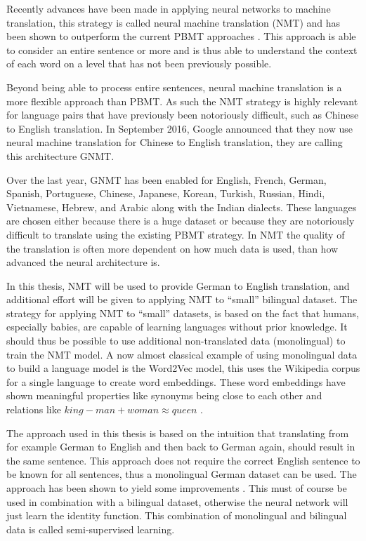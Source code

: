 Recently advances have been made in applying neural networks to machine translation, this strategy is called neural machine translation (NMT) and has been shown to outperform the current PBMT approaches \cite{google-translate-gnmt}. This approach is able to consider an entire sentence or more and is thus able to understand the context of each word on a level that has not been previously possible.

Beyond being able to process entire sentences, neural machine translation is a more flexible approach than PBMT. As such the NMT strategy is highly relevant for language pairs that have previously been notoriously difficult, such as Chinese to English translation. In September 2016, Google announced that they now use neural machine translation for Chinese to English translation, they are calling this architecture GNMT.

Over the last year, GNMT has been enabled for English, French, German, Spanish, Portuguese, Chinese, Japanese, Korean, Turkish, Russian, Hindi, Vietnamese, Hebrew, and Arabic along with the Indian dialects. These languages are chosen either because there is a huge dataset or because they are notoriously difficult to translate using the existing PBMT strategy. In NMT the quality of the translation is often more dependent on how much data is used, than how advanced the neural architecture is.

In this thesis, NMT will be used to provide German to English translation, and additional effort will be given to applying NMT to ``small'' bilingual dataset. The strategy for applying NMT to ``small'' datasets, is based on the fact that humans, especially babies, are capable of learning languages without prior knowledge. It should thus be possible to use additional non-translated data (monolingual) to train the NMT model. A now almost classical example of using monolingual data to build a language model is the Word2Vec model, this uses the Wikipedia corpus for a single language to create word embeddings. These word embeddings have shown meaningful properties like synonyms being close to each other and relations like $king - man + woman \approx queen$ \cite{word2vec}.

The approach used in this thesis is based on the intuition that translating from for example German to English and then back to German again, should result in the same sentence. This approach does not require the correct English sentence to be known for all sentences, thus a monolingual German dataset can be used. The approach has been shown to yield some improvements \cite{semi-supervised}. This must of course be used in combination with a bilingual dataset, otherwise the neural network will just learn the identity function. This combination of monolingual and bilingual data is called semi-supervised learning.

